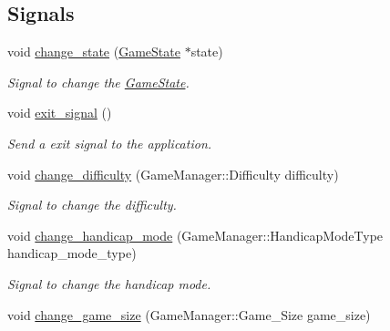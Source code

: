 \subsection*{Signals}
\begin{DoxyCompactItemize}
\item 
\hypertarget{class_game_state_ad23b11eedef61cd2f24cca1f89c4088a}{void \hyperlink{class_game_state_ad23b11eedef61cd2f24cca1f89c4088a}{change\-\_\-state} (\hyperlink{class_game_state}{Game\-State} $\ast$state)}\label{class_game_state_ad23b11eedef61cd2f24cca1f89c4088a}

\begin{DoxyCompactList}\small\item\em Signal to change the \hyperlink{class_game_state}{Game\-State}. \end{DoxyCompactList}\item 
\hypertarget{class_game_state_afd2827b7fa9f6d7fe5cdaeb991c510a9}{void \hyperlink{class_game_state_afd2827b7fa9f6d7fe5cdaeb991c510a9}{exit\-\_\-signal} ()}\label{class_game_state_afd2827b7fa9f6d7fe5cdaeb991c510a9}

\begin{DoxyCompactList}\small\item\em Send a exit signal to the application. \end{DoxyCompactList}\item 
\hypertarget{class_game_state_a1275534bce2a4699db2ca708c33b6588}{void \hyperlink{class_game_state_a1275534bce2a4699db2ca708c33b6588}{change\-\_\-difficulty} (Game\-Manager\-::\-Difficulty difficulty)}\label{class_game_state_a1275534bce2a4699db2ca708c33b6588}

\begin{DoxyCompactList}\small\item\em Signal to change the difficulty. \end{DoxyCompactList}\item 
\hypertarget{class_game_state_a6476b36b7d1cd6d5c1b586ecb8677c91}{void \hyperlink{class_game_state_a6476b36b7d1cd6d5c1b586ecb8677c91}{change\-\_\-handicap\-\_\-mode} (Game\-Manager\-::\-Handicap\-Mode\-Type handicap\-\_\-mode\-\_\-type)}\label{class_game_state_a6476b36b7d1cd6d5c1b586ecb8677c91}

\begin{DoxyCompactList}\small\item\em Signal to change the handicap mode. \end{DoxyCompactList}\item 
\hypertarget{class_game_state_ac66c8bcd0fd40ed2c0d190d4c5626823}{void \hyperlink{class_game_state_ac66c8bcd0fd40ed2c0d190d4c5626823}{change\-\_\-game\-\_\-size} (Game\-Manager\-::\-Game\-\_\-\-Size game\-\_\-size)}\label{class_game_state_ac66c8bcd0fd40ed2c0d190d4c5626823}


\end{DoxyCompactItemize}

